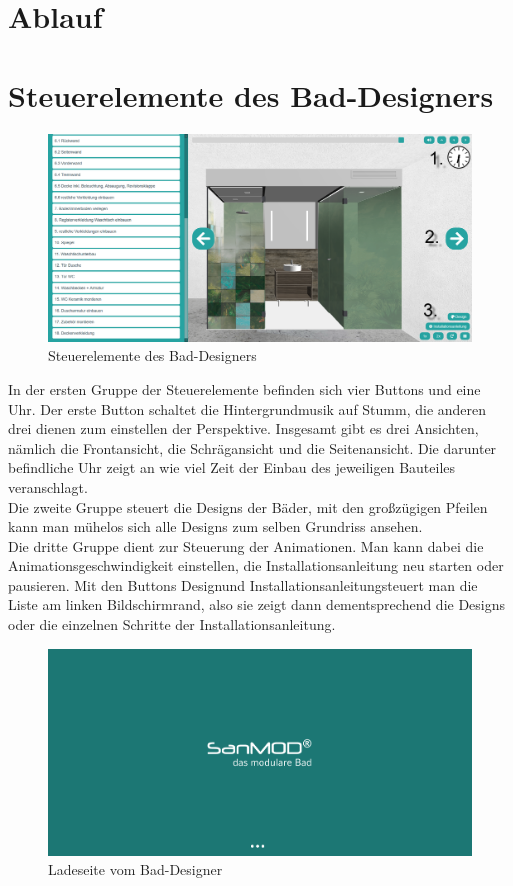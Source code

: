 \section{Ablauf}
\section*{Steuerelemente des Bad-Designers}
\begin{figure}[h]
    \centering
    \includegraphics[width=1\linewidth]{images/screenshots/00_button_desc.png}
    \caption{Steuerelemente des Bad-Designers}
    \label{}
\end{figure}
\noindent In der ersten Gruppe der Steuerelemente befinden sich vier Buttons und eine Uhr. Der erste Button schaltet die Hintergrundmusik auf Stumm, die anderen drei dienen zum einstellen der Perspektive. Insgesamt gibt es drei Ansichten, nämlich die Frontansicht, die Schrägansicht und die Seitenansicht. Die darunter befindliche Uhr zeigt an wie viel Zeit der Einbau des jeweiligen Bauteiles veranschlagt.\\
Die zweite Gruppe steuert die Designs der Bäder, mit den großzügigen Pfeilen kann man mühelos sich alle Designs zum selben Grundriss ansehen.
\\
Die dritte Gruppe dient zur Steuerung der Animationen. Man kann dabei die Animationsgeschwindigkeit einstellen, die Installationsanleitung neu starten oder pausieren. Mit den Buttons \dq Design\dq und \dq Installationsanleitung\dq steuert man die Liste am linken Bildschirmrand, also sie zeigt dann dementsprechend die Designs oder die einzelnen Schritte der Installationsanleitung.
\clearpage \newpage
\begin{figure}[h]
    \centering
    \includegraphics[width=1\linewidth]{images/screenshots/00.png}
    \caption{Ladeseite vom Bad-Designer}
    \label{}
\end{figure}
